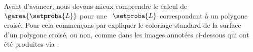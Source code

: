 %
%    
%
%
%
%
%    
%	
%	
%
%
%


Avant d'avancer, nous devons mieux comprendre le calcul de $\garea{\setproba{L}}$ pour une \nline\ $\setproba{L}$ correspondant à un polygone croisé. Pour cela commençons par expliquer le coloriage standard de la surface d'un polygone croisé, ou non, comme dans les images annotées ci-dessous qui ont été produites via \geogebra.
	
